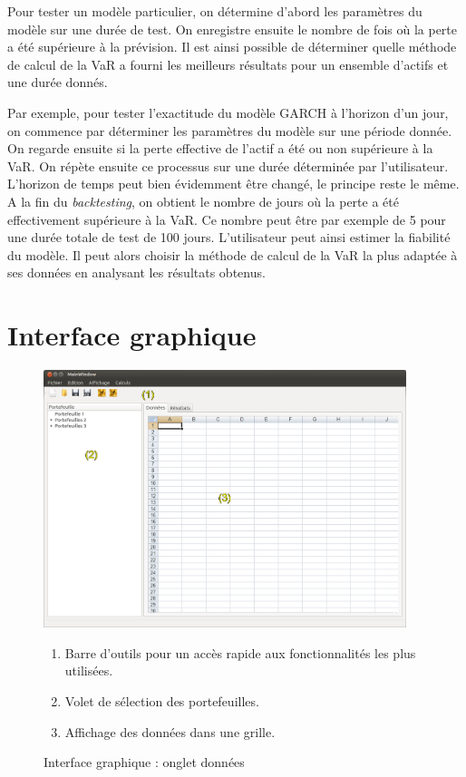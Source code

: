 		Pour tester un modèle particulier, on détermine d'abord les paramètres du modèle sur une durée de test. On enregistre ensuite le nombre de fois où la perte a été supérieure à la prévision. Il est ainsi possible de déterminer quelle méthode de calcul de la VaR a fourni les meilleurs résultats pour un ensemble d'actifs et une durée donnés.

		Par exemple, pour tester l'exactitude du modèle GARCH à l'horizon d'un jour, on commence par déterminer les paramètres du modèle sur une période donnée. On regarde ensuite si la perte effective de l'actif a été ou non supérieure à la VaR. On répète ensuite ce processus sur une durée déterminée par l'utilisateur. L'horizon de temps peut bien évidemment être changé, le principe reste le même. A la fin du \textit{backtesting}, on obtient le nombre de jours où la perte a été effectivement supérieure à la VaR. Ce nombre peut être par exemple de 5 pour une durée totale de test de 100 jours. L'utilisateur peut ainsi estimer la fiabilité du modèle. Il peut alors choisir la méthode de calcul de la VaR la plus adaptée à ses données en analysant les résultats obtenus.



\section{Interface graphique}

	\begin{figure}[ht]
		\includegraphics[width=400px]{logicielDonnees.png}
		\caption{Interface graphique : onglet données}
		\label{interface}
		\begin{enumerate}
			\item Barre d'outils pour un accès rapide aux fonctionnalités les plus utilisées.
			\item Volet de sélection des portefeuilles.
			\item Affichage des données dans une grille. 
		\end{enumerate}
	\end{figure}

